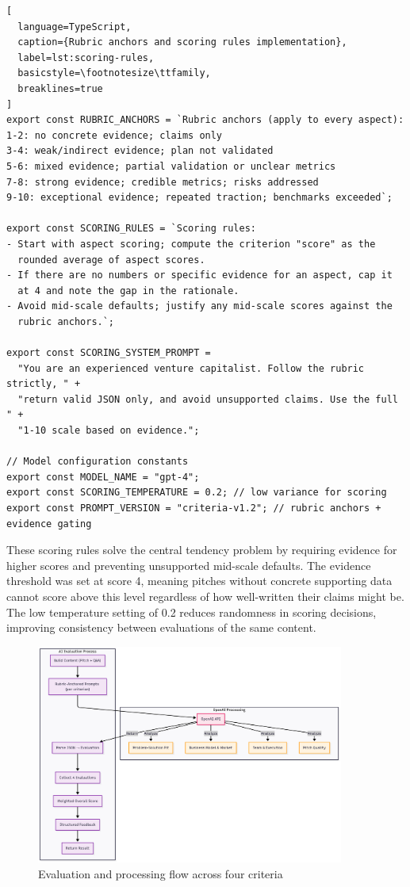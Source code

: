 \begin{lstlisting}[
  language=TypeScript,
  caption={Rubric anchors and scoring rules implementation},
  label=lst:scoring-rules,
  basicstyle=\footnotesize\ttfamily,
  breaklines=true
]
export const RUBRIC_ANCHORS = `Rubric anchors (apply to every aspect):
1-2: no concrete evidence; claims only
3-4: weak/indirect evidence; plan not validated
5-6: mixed evidence; partial validation or unclear metrics
7-8: strong evidence; credible metrics; risks addressed
9-10: exceptional evidence; repeated traction; benchmarks exceeded`;

export const SCORING_RULES = `Scoring rules:
- Start with aspect scoring; compute the criterion "score" as the 
  rounded average of aspect scores.
- If there are no numbers or specific evidence for an aspect, cap it 
  at 4 and note the gap in the rationale.
- Avoid mid-scale defaults; justify any mid-scale scores against the 
  rubric anchors.`;

export const SCORING_SYSTEM_PROMPT = 
  "You are an experienced venture capitalist. Follow the rubric strictly, " +
  "return valid JSON only, and avoid unsupported claims. Use the full " +
  "1-10 scale based on evidence.";

// Model configuration constants
export const MODEL_NAME = "gpt-4";
export const SCORING_TEMPERATURE = 0.2; // low variance for scoring
export const PROMPT_VERSION = "criteria-v1.2"; // rubric anchors + evidence gating
\end{lstlisting}

These scoring rules solve the central tendency problem by requiring evidence for higher scores and preventing unsupported mid-scale defaults. The evidence threshold was set at score 4, meaning pitches without concrete supporting data cannot score above this level regardless of how well-written their claims might be. The low temperature setting of 0.2 reduces randomness in scoring decisions, improving consistency between evaluations of the same content.

\begin{figure}[H]
  \centering
  \includegraphics[width=0.9\textwidth]{img/eval-flow}
\caption{Evaluation and processing flow across four criteria}
  \label{fig:eval-flow}
\end{figure}

